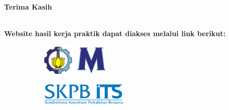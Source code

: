 \documentclass[aspectratio=169,t,xcolor=table]{beamer}
\begin{document}
\begin{frame}
    
    \centering
    \vspace{2cm}
    
    \textbf{\Huge Terima Kasih}
    
    \ \\
    
    \textbf{Website hasil kerja praktik dapat diakses melalui link berikut:}
    \ \\

    \vspace{2cm}
    \begin{figure}
        \centering
        \begin{subfigure}{0.2\textwidth}
            \centering
            \includegraphics[height=1.5cm]{lib/logos/ITSMath.pdf}
        \end{subfigure}
        \qquad
        \begin{subfigure}{0.2\textwidth}
            \centering
            \includegraphics[height=1.2cm]{lib/logos/LogoPerusahaan.png}
        \end{subfigure}
    
    \end{figure}

\end{frame}
\end{document}
